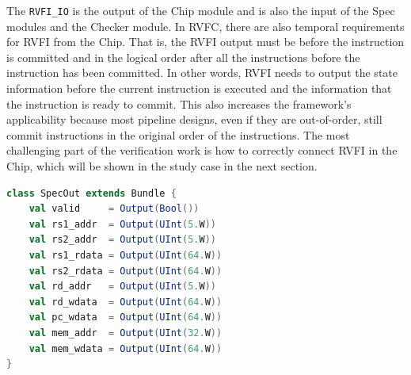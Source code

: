 \documentclass[conference]{IEEEtran}
\theoremstyle{definition}
\begin{document}
The \verb|RVFI_IO| is the output of the Chip module and is also the input of the Spec modules and the Checker module.
In RVFC, there are also temporal requirements for RVFI from the Chip.
That is, the RVFI output must be before the instruction is committed and in the logical order after all the instructions before the instruction has been committed.
In other words, RVFI needs to output the state information before the current instruction is executed and the information that the instruction is ready to commit.
This also increases the framework's applicability because most pipeline designs, even if they are out-of-order, still commit instructions in the original order of the instructions.
The most challenging part of the verification work is how to correctly connect RVFI in the Chip, which will be shown in the study case in the next section.

\begin{lstlisting}[language=scala, caption={SpecOut Definition in RVFC}, label=specout]
class SpecOut extends Bundle {
    val valid     = Output(Bool())
    val rs1_addr  = Output(UInt(5.W))
    val rs2_addr  = Output(UInt(5.W))
    val rs1_rdata = Output(UInt(64.W))
    val rs2_rdata = Output(UInt(64.W))
    val rd_addr   = Output(UInt(5.W))
    val rd_wdata  = Output(UInt(64.W))
    val pc_wdata  = Output(UInt(64.W))
    val mem_addr  = Output(UInt(32.W))
    val mem_wdata = Output(UInt(64.W))
}
\end{lstlisting}
\end{document}

